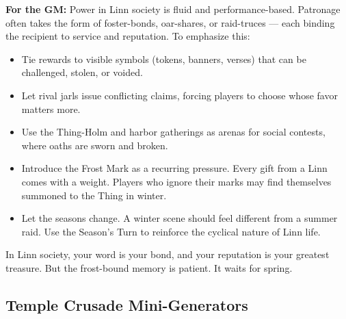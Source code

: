 \textbf{For the GM:}  
Power in Linn society is fluid and performance-based. Patronage often takes the form of foster-bonds, oar-shares, or raid-truces --- each binding the recipient to service and reputation. To emphasize this:
\begin{itemize}
\item Tie rewards to visible symbols (tokens, banners, verses) that can be challenged, stolen, or voided.
\item Let rival jarls issue conflicting claims, forcing players to choose whose favor matters more.
\item Use the Thing-Holm and harbor gatherings as arenas for social contests, where oaths are sworn and broken.
\item Introduce the Frost Mark as a recurring pressure. Every gift from a Linn comes with a weight. Players who ignore their marks may find themselves summoned to the Thing in winter.
\item Let the seasons change. A winter scene should feel different from a summer raid. Use the Season's Turn to reinforce the cyclical nature of Linn life.
\end{itemize}
In Linn society, your word is your bond, and your reputation is your greatest treasure. But the frost-bound memory is patient. It waits for spring.

\subsection*{Temple Crusade Mini-Generators}

